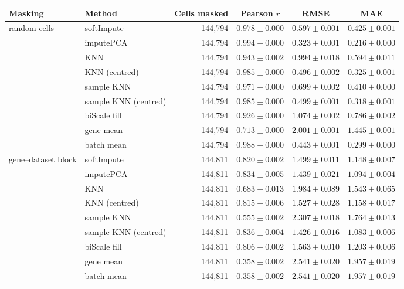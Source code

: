 \begin{tabular}{@{}llrccc@{}}
\toprule
\textbf{Masking} & \textbf{Method} & \textbf{Cells masked} & \textbf{Pearson $r$} & \textbf{RMSE} & \textbf{MAE} \\
\midrule
random cells & softImpute & 144{,}794 & $0.978 \pm 0.000$ & $0.597 \pm 0.001$ & $0.425 \pm 0.001$ \\
 & imputePCA & 144{,}794 & $0.994 \pm 0.000$ & $0.323 \pm 0.001$ & $0.216 \pm 0.000$ \\
 & KNN & 144{,}794 & $0.943 \pm 0.002$ & $0.994 \pm 0.018$ & $0.594 \pm 0.011$ \\
 & KNN (centred) & 144{,}794 & $0.985 \pm 0.000$ & $0.496 \pm 0.002$ & $0.325 \pm 0.001$ \\
 & sample KNN & 144{,}794 & $0.971 \pm 0.000$ & $0.699 \pm 0.002$ & $0.410 \pm 0.000$ \\
 & sample KNN (centred) & 144{,}794 & $0.985 \pm 0.000$ & $0.499 \pm 0.001$ & $0.318 \pm 0.001$ \\
 & biScale fill & 144{,}794 & $0.926 \pm 0.000$ & $1.074 \pm 0.002$ & $0.786 \pm 0.002$ \\
 & gene mean & 144{,}794 & $0.713 \pm 0.000$ & $2.001 \pm 0.001$ & $1.445 \pm 0.001$ \\
 & batch mean & 144{,}794 & $0.988 \pm 0.000$ & $0.443 \pm 0.001$ & $0.299 \pm 0.000$ \\
\addlinespace
gene--dataset block & softImpute & 144{,}811 & $0.820 \pm 0.002$ & $1.499 \pm 0.011$ & $1.148 \pm 0.007$ \\
 & imputePCA & 144{,}811 & $0.834 \pm 0.005$ & $1.439 \pm 0.021$ & $1.094 \pm 0.004$ \\
 & KNN & 144{,}811 & $0.683 \pm 0.013$ & $1.984 \pm 0.089$ & $1.543 \pm 0.065$ \\
 & KNN (centred) & 144{,}811 & $0.815 \pm 0.006$ & $1.527 \pm 0.028$ & $1.158 \pm 0.017$ \\
 & sample KNN & 144{,}811 & $0.555 \pm 0.002$ & $2.307 \pm 0.018$ & $1.764 \pm 0.013$ \\
 & sample KNN (centred) & 144{,}811 & $0.836 \pm 0.004$ & $1.426 \pm 0.016$ & $1.083 \pm 0.006$ \\
 & biScale fill & 144{,}811 & $0.806 \pm 0.002$ & $1.563 \pm 0.010$ & $1.203 \pm 0.006$ \\
 & gene mean & 144{,}811 & $0.358 \pm 0.002$ & $2.541 \pm 0.020$ & $1.957 \pm 0.019$ \\
 & batch mean & 144{,}811 & $0.358 \pm 0.002$ & $2.541 \pm 0.020$ & $1.957 \pm 0.019$ \\

\end{tabular}
